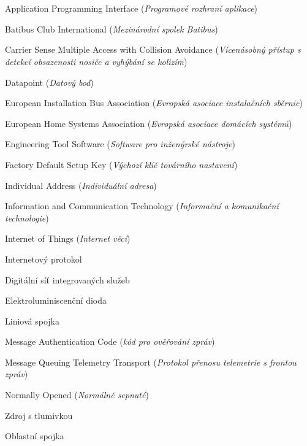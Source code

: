 \cleardoublepage
\chapter*{\listofabbrevname}
{}

\begin{acronym}[KolikMista]
	{Application Programming Interface (\textit{Programové rozhraní aplikace})}

	{Batibus Club International (\textit{Mezinárodní spolek Batibus})}

	{Carrier Sense Multiple Access with Collision Avoidance (\textit{Vícenásobný přístup s detekcí obsazenosti nosiče a vyhýbání se kolizím})}

	{Datapoint (\textit{Datový bod})}

	{European Installation Bus Association (\textit{Evropská asociace instalačních sběrnic})}

	{European Home Systems Association (\textit{Evropská asociace domácích systémů})}

	{Engineering Tool Software (\textit{Software pro inženýrské nástroje})}

	{Factory Default Setup Key (\textit{Výchozí klíč továrního nastavení})}

	{Individual Address (\textit{Individuální adresa})}

	{Information and Communication Technology (\textit{Informační a komunikační technologie})}

	{Internet of Things (\textit{Internet věcí})}

	{Internetový protokol}

	{Digitální síť integrovaných služeb}

	{Elektroluminiscenční dioda}

	{Liniová spojka}

	{Message Authentication Code (\textit{kód pro ověřování zpráv})}

	{Message Queuing Telemetry Transport (\textit{Protokol přenosu telemetrie s frontou zpráv})}

	{Normally Opened (\textit{Normálně sepnuté})}

	{Zdroj s tlumivkou}

	{Oblastní spojka}


\end{acronym}
